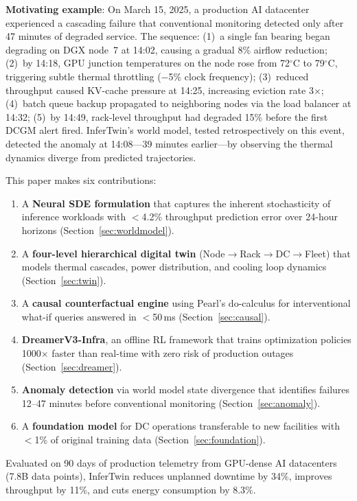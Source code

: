 \documentclass[conference,10pt]{IEEEtran}
\begin{document}
\textbf{Motivating example}: On March 15, 2025, a production AI datacenter experienced a cascading failure that conventional monitoring detected only after 47 minutes of degraded service. The sequence: (1)~a single fan bearing began degrading on DGX node~7 at 14:02, causing a gradual 8\% airflow reduction; (2)~by 14:18, GPU junction temperatures on the node rose from 72$^\circ$C to 79$^\circ$C, triggering subtle thermal throttling ($-$5\% clock frequency); (3)~reduced throughput caused KV-cache pressure at 14:25, increasing eviction rate 3$\times$; (4)~batch queue backup propagated to neighboring nodes via the load balancer at 14:32; (5)~by 14:49, rack-level throughput had degraded 15\% before the first DCGM alert fired. InferTwin's world model, tested retrospectively on this event, detected the anomaly at 14:08---39 minutes earlier---by observing the thermal dynamics diverge from predicted trajectories.

This paper makes six contributions:
\begin{enumerate}
\item A \textbf{Neural SDE formulation} that captures the inherent stochasticity of inference workloads with $<$4.2\% throughput prediction error over 24-hour horizons (Section~\ref{sec:worldmodel}).
\item A \textbf{four-level hierarchical digital twin} (Node$\to$Rack$\to$DC$\to$Fleet) that models thermal cascades, power distribution, and cooling loop dynamics (Section~\ref{sec:twin}).
\item A \textbf{causal counterfactual engine} using Pearl's do-calculus for interventional what-if queries answered in $<$50\,ms (Section~\ref{sec:causal}).
\item \textbf{DreamerV3-Infra}, an offline RL framework that trains optimization policies 1000$\times$ faster than real-time with zero risk of production outages (Section~\ref{sec:dreamer}).
\item \textbf{Anomaly detection} via world model state divergence that identifies failures 12--47 minutes before conventional monitoring (Section~\ref{sec:anomaly}).
\item A \textbf{foundation model} for DC operations transferable to new facilities with $<$1\% of original training data (Section~\ref{sec:foundation}).
\end{enumerate}

Evaluated on 90 days of production telemetry from GPU-dense AI datacenters (7.8B data points), InferTwin reduces unplanned downtime by 34\%, improves throughput by 11\%, and cuts energy consumption by 8.3\%.
\end{document}
